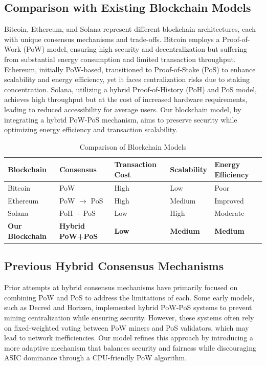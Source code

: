 \documentclass[conference]{IEEEtran}
\begin{document}
\subsection{Comparison with Existing Blockchain Models}
Bitcoin, Ethereum, and Solana represent different blockchain architectures, each with unique consensus mechanisms and trade-offs. Bitcoin employs a Proof-of-Work (PoW) model, ensuring high security and decentralization but suffering from substantial energy consumption and limited transaction throughput. Ethereum, initially PoW-based, transitioned to Proof-of-Stake (PoS) to enhance scalability and energy efficiency, yet it faces centralization risks due to staking concentration. Solana, utilizing a hybrid Proof-of-History (PoH) and PoS model, achieves high throughput but at the cost of increased hardware requirements, leading to reduced accessibility for average users. Our blockchain model, by integrating a hybrid PoW-PoS mechanism, aims to preserve security while optimizing energy efficiency and transaction scalability.

\begin{table}[ht]
\centering
\caption{Comparison of Blockchain Models}
\renewcommand{\arraystretch}{1.3}
\begin{tabularx}{\linewidth}{|X|X|X|X|X|}
\hline
\textbf{Blockchain} & \textbf{Consensus} & \textbf{Transaction Cost} & \textbf{Scalability} & \textbf{Energy Efficiency} \\
\hline
Bitcoin & PoW & High & Low & Poor \\
\hline
Ethereum & PoW $\rightarrow$ PoS & High & Medium & Improved \\
\hline
Solana & PoH + PoS & Low & High & Moderate \\
\hline
\textbf{Our Blockchain} & \textbf{Hybrid PoW+PoS} & \textbf{Low} & \textbf{Medium} & \textbf{Medium} \\
\hline
\end{tabularx}
\label{tab:blockchain_comparison}
\end{table}



\subsection{Previous Hybrid Consensus Mechanisms}
Prior attempts at hybrid consensus mechanisms have primarily focused on combining PoW and PoS to address the limitations of each. Some early models, such as Decred and Horizen, implemented hybrid PoW-PoS systems to prevent mining centralization while ensuring security. However, these systems often rely on fixed-weighted voting between PoW miners and PoS validators, which may lead to network inefficiencies. Our model refines this approach by introducing a more adaptive mechanism that balances security and fairness while discouraging ASIC dominance through a CPU-friendly PoW algorithm.
\end{document}
